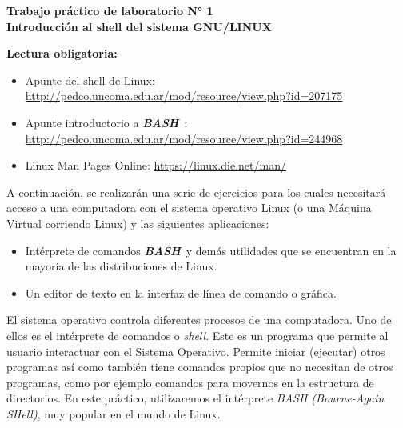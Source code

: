 \documentclass[12pt]{article}
\def\maketitle{

\makeatletter
{\color{bl} \centering \huge \sc \textbf{ Trabajo práctico de laboratorio N° 1\\ \large
\vspace*{-8pt} \color{black} Introducción al shell del sistema GNU/LINUX \vspace*{8pt} }\par}
\makeatother

\makeatletter


}
\newcommand{\bash}{\textbf{\emph{BASH}}\ }
\begin{document}
\thispagestyle{empty}
\maketitle
\setlength{\parindent}{1pt}

\textbf{Lectura obligatoria:}

\vspace{-2\topsep}
\begin{itemize}

    \itemsep2pt \parskip0pt 

    \item Apunte del shell de Linux:
        \url{http://pedco.uncoma.edu.ar/mod/resource/view.php?id=207175}

    \item Apunte introductorio a \bash:
        \url{http://pedco.uncoma.edu.ar/mod/resource/view.php?id=244968}

    \item Linux Man Pages Online: \url{https://linux.die.net/man/}

\end{itemize}

A continuación, se realizarán una serie de ejercicios para los cuales
necesitará acceso a una computadora con el sistema operativo Linux (o una
Máquina Virtual corriendo Linux) y las siguientes aplicaciones:

\vspace{-2\topsep}
\begin{itemize}

    \itemsep2pt \parskip0pt 

    \item   Intérprete de comandos \bash y demás utilidades que se encuentran
        en la mayoría de las distribuciones de Linux.

    \item   Un editor de texto en la interfaz de línea de comando o gráfica.

\end{itemize}

El sistema operativo controla diferentes procesos de una computadora. Uno de
ellos es el intérprete de comandos o \emph{shell}. Este es un programa que
permite al usuario interactuar con el Sistema Operativo. Permite iniciar
(ejecutar) otros programas así como también tiene comandos propios que no
necesitan de otros programas, como por ejemplo comandos para movernos en la
estructura de directorios. En este práctico, utilizaremos el intérprete
\emph{BASH (Bourne-Again SHell)}, muy popular en el mundo de Linux.
\end{document}
